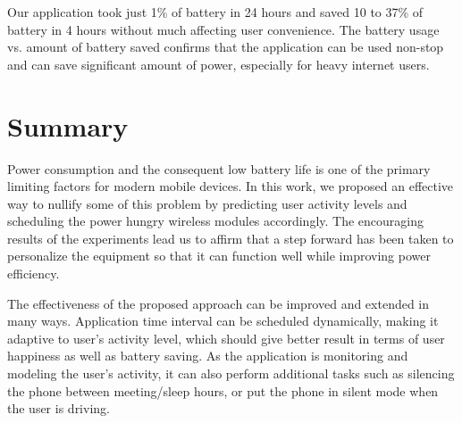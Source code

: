 Our application took just 1\% of battery in 24 hours and saved 10 to 37\% of battery in 4 hours without much affecting
user convenience. The battery usage vs. amount of battery saved confirms that the application can be used non-stop and can
save significant amount of power, especially for heavy internet users.
\newpage
\section{Summary}
Power consumption and the consequent low battery life is one of the primary limiting factors for modern mobile devices.
In this work, we proposed an effective way to nullify some of this problem by predicting user activity levels and scheduling
the power hungry wireless modules accordingly. The encouraging results of the experiments lead us to affirm that a step
forward has been taken to personalize the equipment so that it can function well while improving power efficiency.

The effectiveness of the proposed approach can be improved and extended in many ways. Application time interval
can be scheduled dynamically, making it adaptive to user's activity level, which should give better result in terms of user happiness
as well as battery saving. As the application is monitoring and modeling the user's activity, it can also perform additional tasks
such as silencing the phone between meeting/sleep hours, or put the phone in silent mode when the user is driving.
